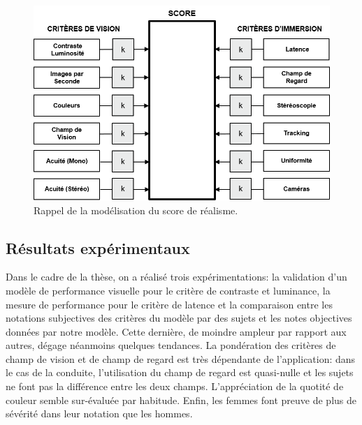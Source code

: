 	\begin{figure}
		\centering
		\includegraphics[scale=1]{Figures/ScoreRealismeMini}
		\caption{Rappel de la modélisation du score de réalisme.}
		\label{fig:score_realisme_mini}
	\end{figure}
	
	\subsection*{Résultats expérimentaux}
	\par Dans le cadre de la thèse, on a réalisé trois expérimentations: la validation d'un modèle de performance visuelle pour le critère de contraste et luminance, la mesure de performance pour le critère de latence et la comparaison entre les notations subjectives des critères du modèle par des sujets et les notes objectives données par notre modèle. Cette dernière, de moindre ampleur par rapport aux autres, dégage néanmoins quelques tendances. La pondération des critères de champ de vision et de champ de regard est très dépendante de l'application: dans le cas de la conduite, l'utilisation du champ de regard est quasi-nulle et les sujets ne font pas la différence entre les deux champs. L'appréciation de la quotité de couleur semble sur-évaluée par habitude. Enfin, les femmes font preuve de plus de sévérité dans leur notation que les hommes.
	
